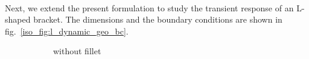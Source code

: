     \pagebreak
\paragraph{}
Next, we extend the present formulation to study the transient response of an L-shaped bracket.
The dimensions and the boundary conditions are shown in fig.~\ref{iso_fig:l_dynamic_geo_bc}.
    \begin{figure}
        \begin{subfigure}[b]{1\linewidth}
            \centering
            \caption{without fillet}
        \end{subfigure}
        \begin{subfigure}[b]{1\linewidth}
            \centering
            \scalebox{0.8}{
}
\end{subfigure}
\end{figure}
